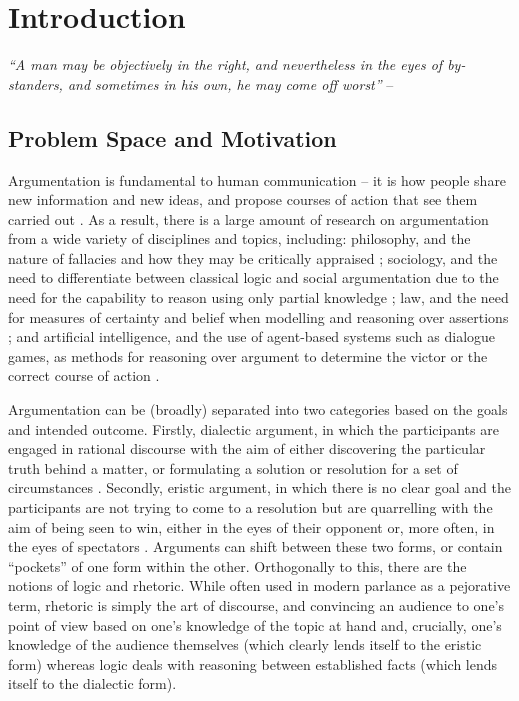 

\chapter{Introduction}
\label{introduction}

\textit{``A man may be objectively in the right, and nevertheless in the eyes of by-standers, and sometimes in his own, he may come off worst''} -- \citeauthor[The Art of Always Being Right]{Schopenhauer2009}

\section{Problem Space and Motivation}
\label{introduction:problemspace}

Argumentation is fundamental to human communication -- it is how people share new information and new ideas, and propose courses of action that see them carried out \citep{hahn2005circular, Moor2006}. As a result, there is a large amount of research on argumentation from a wide variety of disciplines and topics, including: philosophy, and the nature of fallacies and how they may be critically appraised \citep{tindale2007}; sociology, and the need to differentiate between classical logic and social argumentation due to the need for the capability to reason using only partial knowledge \citep{polos2002reasoning}; law, and the need for measures of certainty and belief when modelling and reasoning over assertions \citep{bertea2004certainty}; and artificial intelligence, and the use of agent-based systems such as dialogue games, as methods for reasoning over argument to determine the victor or the correct course of action \citep{bench2007argumentation, karunatillake2008}.

Argumentation can be (broadly) separated into two categories based on the goals and intended outcome. Firstly, dialectic argument, in which the participants are engaged in rational discourse with the aim of either discovering the particular truth behind a matter, or formulating a solution or resolution for a set of circumstances \citep{kerferd1981}. Secondly, eristic argument, in which there is no clear goal and the participants are not trying to come to a resolution but are quarrelling with the aim of being seen to win, either in the eyes of their opponent or, more often, in the eyes of spectators \citep{kerferd1981, Jorgensen1998}. Arguments can shift between these two forms, or contain ``pockets'' of one form within the other. Orthogonally to this, there are the notions of logic and rhetoric. While often used in modern parlance as a pejorative term, rhetoric is simply the art of discourse, and convincing an audience to one's point of view based on one's knowledge of the topic at hand and, crucially, one's knowledge of the audience themselves (which clearly lends itself to the eristic form) whereas logic deals with reasoning between established facts (which lends itself to the dialectic form).

